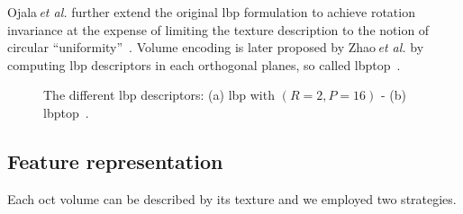 Ojala\,\textit{et al.} further extend the original \ac{lbp} formulation to achieve rotation invariance at the expense of limiting the texture description to the notion of circular ``uniformity''~\cite{ojala2002multiresolution}. Volume encoding is later proposed by Zhao\,\textit{et al.} by computing \ac{lbp} descriptors in each orthogonal planes, so called \ac{lbptop}~\cite{zhao2012rotation}.

\begin{figure}[t]
  \centering
  \hspace*{\fill}
   \hfill
  \hspace*{\fill}
  \caption{The different \ac{lbp} descriptors: (a) \ac{lbp} with $(R=2,P=16)$ - (b) \ac{lbptop}~\cite{zhao2012rotation}.}
  \label{fig:lbp}
\end{figure}

\subsection{Feature representation}\label{subsec:fearep}

Each \ac{oct} volume can be described by its texture and we employed two strategies.

